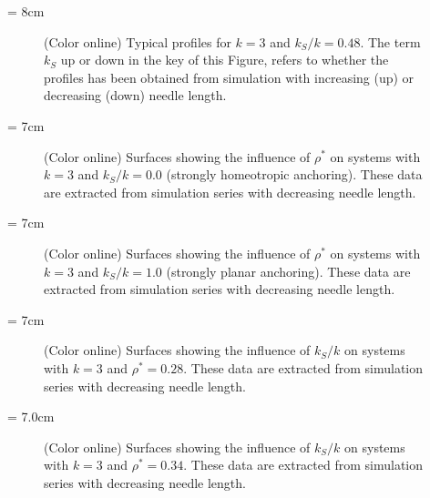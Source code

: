 \documentclass[aps,10pt,twocolumn]{revtex4}
\begin{document}
\picW = 8cm
\begin{figure}
        \centering
    \caption{(Color online) Typical profiles for $k=3$ and $k_S/k = 0.48$. The term $k_S$ up or down in the key
    of this Figure, refers to whether the profiles has been obtained from simulation with
    increasing (up) or decreasing (down) needle length.}
    \label{fig:typicalProfile_k3_bist}
\end{figure}
\clearpage
\pagebreak
\picW = 7cm
\begin{figure}
        \centering
    \caption{(Color online) Surfaces showing the influence of $\rho^{*}$ on systems with $k=3$ and $k_S/k =
    0.0$ (strongly homeotropic anchoring). These data are extracted from simulation series with
    decreasing needle length.}
    \label{fig:rhoInfl_k3_L000}
\end{figure}

\picW = 7cm
\begin{figure}
        \centering
    \caption{(Color online) Surfaces showing the influence of $\rho^{*}$ on systems with $k=3$ and $k_S/k = 1.0$ (strongly planar anchoring).
    These data are extracted from simulation series with decreasing needle length.}
    \label{fig:rhoInfl_k3_L100}
\end{figure}


\picW = 7cm
\begin{figure}
        \centering
    \caption{(Color online) Surfaces showing the influence of $k_S/k$ on systems with $k=3$ and $\rho^{*} = 0.28$.
    These data are extracted from simulation series with decreasing needle length.}
    \label{fig:LnInfl_k3_d0.28}
\end{figure}

\picW = 7.0cm
\begin{figure}
        \centering
    \caption{(Color online) Surfaces showing the influence of $k_S/k$ on systems with $k=3$ and $\rho^{*} = 0.34$.
    These data are extracted from simulation series with decreasing needle length.}
    \label{fig:LnInfl_k3_d0.34}
\end{figure}
\end{document}

